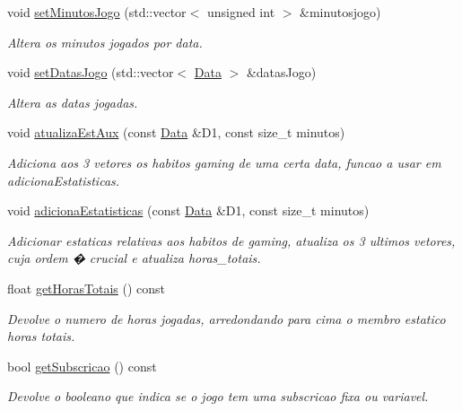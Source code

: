 \begin{DoxyCompactItemize}
void \mbox{\hyperlink{class_online_a71cc818cd9b8020a470efc14f636a9f9}{set\+Minutos\+Jogo}} (std\+::vector$<$ unsigned int $>$ \&minutosjogo)
\begin{DoxyCompactList}\small\item\em Altera os minutos jogados por data. \end{DoxyCompactList}\item 
void \mbox{\hyperlink{class_online_a3c0b8d3393271eabfa702629c979fb93}{set\+Datas\+Jogo}} (std\+::vector$<$ \mbox{\hyperlink{class_data}{Data}} $>$ \&datas\+Jogo)
\begin{DoxyCompactList}\small\item\em Altera as datas jogadas. \end{DoxyCompactList}\item 
void \mbox{\hyperlink{class_online_a1796bfbb1c3210f26ca8e1cddc61d830}{atualiza\+Est\+Aux}} (const \mbox{\hyperlink{class_data}{Data}} \&D1, const size\+\_\+t minutos)
\begin{DoxyCompactList}\small\item\em Adiciona aos 3 vetores os habitos gaming de uma certa data, funcao a usar em adiciona\+Estatisticas. \end{DoxyCompactList}\item 
void \mbox{\hyperlink{class_online_aac2ef3483edfaa8426363ebdd542dc38}{adiciona\+Estatisticas}} (const \mbox{\hyperlink{class_data}{Data}} \&D1, const size\+\_\+t minutos)
\begin{DoxyCompactList}\small\item\em Adicionar estaticas relativas aos habitos de gaming, atualiza os 3 ultimos vetores, cuja ordem � crucial e atualiza horas\+\_\+totais. \end{DoxyCompactList}\item 
float \mbox{\hyperlink{class_online_ad0a23d2f1a2f804479ff346be0fdc686}{get\+Horas\+Totais}} () const
\begin{DoxyCompactList}\small\item\em Devolve o numero de horas jogadas, arredondando para cima o membro estatico horas totais. \end{DoxyCompactList}\item 
bool \mbox{\hyperlink{class_online_aa222489df5a1e6bcfbf5e01d95178850}{get\+Subscricao}} () const
\begin{DoxyCompactList}\small\item\em Devolve o booleano que indica se o jogo tem uma subscricao fixa ou variavel. \end{DoxyCompactList}\item 

\end{DoxyCompactItemize}
